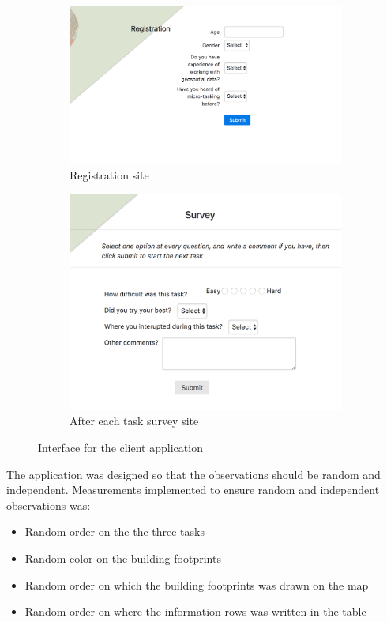 \begin{figure}[H]
	\centering
	\begin{subfigure}[b]{0.50\textwidth}
		\centering
		\includegraphics[width=\linewidth]{fig/mt-registration}
		\caption{Registration site}
		\label{fig:mt-registration}
	\end{subfigure}
	\begin{subfigure}[b]{0.46\textwidth}
		\centering
		\includegraphics[width=\linewidth]{fig/mt-survey}
		\caption{After each task survey site}
		\label{fig:mt-survey}
	\end{subfigure}
	\caption{Interface for the client application}
	\label{fig:client-interface}
\end{figure}
       
The application was designed so that the observations should be random and independent. Measurements implemented to ensure random and independent observations was:
\begin{itemize}
	\item Random order on the the three tasks
	\item Random color on the building footprints
	\item Random order on which the building footprints was drawn on the map
	\item Random order on where the information rows was written in the table
\end{itemize}

